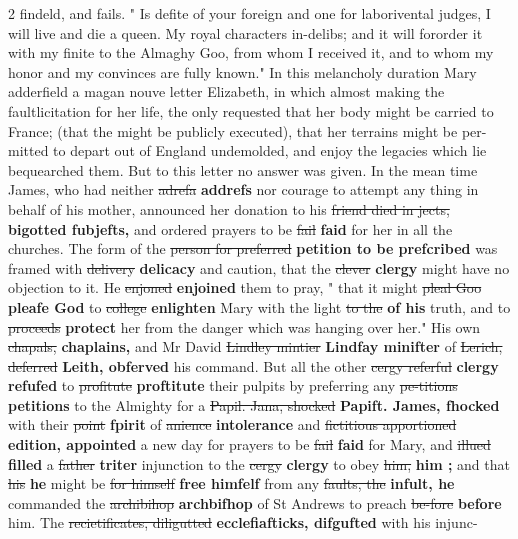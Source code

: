 \documentclass[10pt]{article}
\begin{document}
\begin{multicols}{2}
findeld, and fails. " Is defite of your foreign and one for laborivental judges, I will live and die a queen. My royal characters in-delibs; and it will fororder it with my finite to the Almaghy Goo, from whom I received it, and to whom my honor and my convinces are fully known." In this melancholy duration Mary adderfield a magan nouve letter Elizabeth, in which almost making the faultlicitation for her life, the only requested that her body might be carried to France; (that the might be publicly executed), that her terrains might be per-mitted to depart out of England undemolded, and enjoy the legacies which lie bequearched them. But to this letter no answer was given. In the mean time James, who had neither \sout{adrefa} \textbf{addrefs} nor courage to attempt any thing in behalf of his mother, announced her donation to his \sout{friend died in jects,} \textbf{bigotted fubjefts,} and ordered prayers to be \sout{fail} \textbf{faid} for her in all the churches. The form of the \sout{person for preferred} \textbf{petition to be prefcribed} was framed with \sout{delivery} \textbf{delicacy} and caution, that the \sout{clever} \textbf{clergy} might have no objection to it. He \sout{enjoned} \textbf{enjoined} them to pray, " that it might \sout{pleal Goo} \textbf{pleafe God} to \sout{college} \textbf{enlighten} Mary with the light \sout{to the} \textbf{of his} truth, and to \sout{proceeds} \textbf{protect} her from the danger which was hanging over her." His own \sout{chapals,} \textbf{chaplains,} and Mr David \sout{Lindley mintier} \textbf{Lindfay minifter} of \sout{Lerich, deferred} \textbf{Leith, obferved} his command. But all the other \sout{cergy referful} \textbf{clergy refufed} to \sout{profitute} \textbf{proftitute} their pulpits by preferring any \sout{pe-titions} \textbf{petitions} to the Almighty for a \sout{Papil. Jana, shocked} \textbf{Papift. James, fhocked} with their \sout{point} \textbf{fpirit} of \sout{anience} \textbf{intolerance} and \sout{fictitious apportioned} \textbf{edition, appointed} a new day for prayers to be \sout{fail} \textbf{faid} for Mary, and \sout{illued} \textbf{filled} a \sout{father} \textbf{triter} injunction to the \sout{cergy} \textbf{clergy} to obey \sout{him,} \textbf{him ;} and that \sout{his} \textbf{he} might be \sout{for himself} \textbf{free himfelf} from any \sout{faults, the} \textbf{infult, he} commanded the \sout{archibihop} \textbf{archbifhop} of St Andrews to preach \sout{be-fore} \textbf{before} him. The \sout{recietificates, diligutted} \textbf{ecclefiafticks, difgufted} with his injunc-
\end{multicols}
\end{document}
